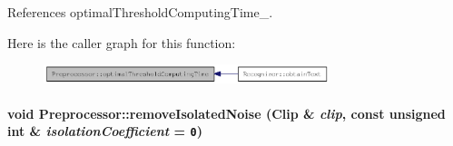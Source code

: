 References optimalThresholdComputingTime\_\-.

Here is the caller graph for this function:\nopagebreak
\begin{figure}[H]
\begin{center}
\leavevmode
\includegraphics[width=236pt]{class_preprocessor_72aa2eb5f3a7e7ee0d3ca27ddd6bfc5e_icgraph}
\end{center}
\end{figure}
\hypertarget{class_preprocessor_a3e047486a0a80f2103f51d7141e41c5}{
\paragraph[{removeIsolatedNoise}]{\setlength{\rightskip}{0pt plus 5cm}void Preprocessor::removeIsolatedNoise ({\bf Clip} \& {\em clip}, \/  const unsigned int \& {\em isolationCoefficient} = {\tt 0})}\hfill}
\label{class_preprocessor_a3e047486a0a80f2103f51d7141e41c5}


